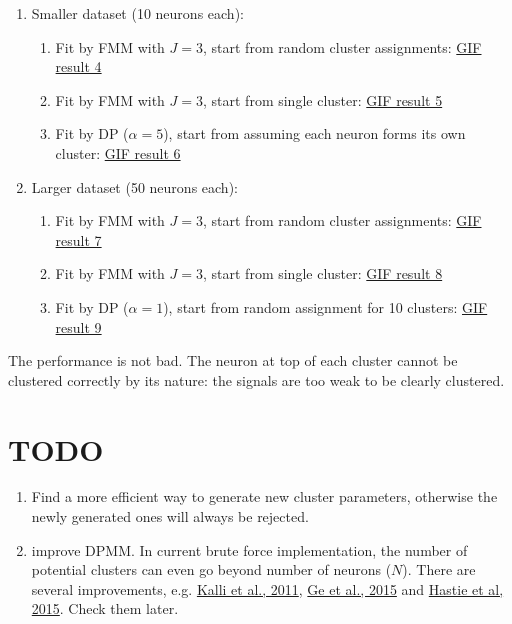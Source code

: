 \documentclass[]{article}
\begin{document}
\begin{enumerate}
	\def\labelenumi{(\arabic{enumi})}
	\item
	Smaller dataset (10 neurons each):\\
	\begin{enumerate}
		\def\labelenumi{\alph{enumi}.}
		\item
		Fit by FMM with \(J = 3\), start from random cluster assignments:
		\href{https://github.com/weigcdsb/state-space-clustering/blob/main/results/gif/noA_10_MM_above.gif}{GIF result 4}
		\item
		Fit by FMM with \(J = 3\), start from single cluster:
		\href{https://github.com/weigcdsb/state-space-clustering/blob/main/results/gif/noA_10_MM_below.gif}{GIF result 5}
		\item
		Fit by DP (\(\alpha = 5\)), start from assuming each neuron forms its own cluster:
		\href{https://github.com/weigcdsb/state-space-clustering/blob/main/results/gif/noA_10_DP_above_5.gif}{GIF result 6}
	\end{enumerate}
	
	\item
	Larger dataset (50 neurons each):\\
	\begin{enumerate}
		\def\labelenumi{\alph{enumi}.}
		\item
		Fit by FMM with \(J = 3\), start from random cluster assignments:
		\href{https://github.com/weigcdsb/state-space-clustering/blob/main/results/gif/noA_50_MM_above.gif}{GIF result 7}
		\item
		Fit by FMM with \(J = 3\), start from single cluster:
		\href{https://github.com/weigcdsb/state-space-clustering/blob/main/results/gif/noA_50_MM_below.gif}{GIF result 8}
		\item
		Fit by DP (\(\alpha = 1\)), start from random assignment for 10 clusters:
		\href{https://github.com/weigcdsb/state-space-clustering/blob/main/results/gif/noA_50_DP_above1.gif}{GIF result 9}
	\end{enumerate}
\end{enumerate}

The performance is not bad. The neuron at top of each cluster cannot be clustered correctly by its nature: the signals are too weak to be clearly clustered.

\section{TODO}
\begin{enumerate}
	\def\labelenumi{(\arabic{enumi})}
	\item
	Find a more efficient way to generate new cluster parameters, otherwise the newly generated ones will always be rejected.
	\item
	improve DPMM. In current brute force implementation, the number of potential clusters can even go beyond number of neurons (\(N\)). There are several improvements, e.g. \href{https://link.springer.com/article/10.1007/s11222-009-9150-y}{Kalli et al., 2011}, \href{http://proceedings.mlr.press/v37/gea15.html}{Ge et al., 2015} and \href{https://link.springer.com/article/10.1007/s11222-014-9471-3}{Hastie et al, 2015}. Check them later.
\end{enumerate}
\end{document}
